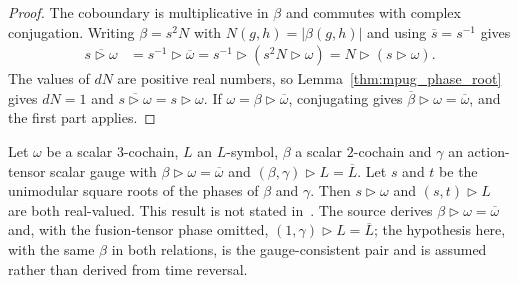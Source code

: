 \begin{proof}\leanok
    The coboundary is multiplicative in $\beta$ and commutes with complex
    conjugation. Writing $\beta=s^2N$ with $N(g,h)=|\beta(g,h)|$ and using
    $\overline s=s^{-1}$ gives
    \begin{align}
        \overline{s\mathbin{\triangleright}\omega}
         & =s^{-1}\mathbin{\triangleright}\overline\omega
        =s^{-1}\mathbin{\triangleright}(s^2N\mathbin{\triangleright}\omega)
        =N\mathbin{\triangleright}(s\mathbin{\triangleright}\omega).
    \end{align}
    The values of $dN$ are positive real numbers, so
    Lemma~\ref{thm:mpug_phase_root} gives $dN=1$ and
    $\overline{s\mathbin{\triangleright}\omega}
        =s\mathbin{\triangleright}\omega$. If
    $\omega=\beta\mathbin{\triangleright}\overline\omega$, conjugating gives
    $\overline\beta\mathbin{\triangleright}\omega=\overline\omega$, and the
    first part applies.
\end{proof}

\begin{lemma}
    \label{thm:mpug_time_reversal_real_l_symbols}
    \leanok
    Let $\omega$ be a scalar $3$-cochain, $L$ an $L$-symbol, $\beta$ a
    scalar $2$-cochain and $\gamma$ an action-tensor scalar gauge with
    $\beta\mathbin{\triangleright}\omega=\overline\omega$ and
    $(\beta,\gamma)\mathbin{\triangleright}L=\overline L$. Let $s$ and $t$ be
    the unimodular square roots of the phases of $\beta$ and $\gamma$. Then
    $s\mathbin{\triangleright}\omega$ and
    $(s,t)\mathbin{\triangleright}L$ are both real-valued. This result is not stated
    in~\cite[Section~4.3]{GarreRubio2023MPOSym}.
    The source derives $\beta\mathbin{\triangleright}\omega=\overline\omega$
    and, with the fusion-tensor phase omitted,
    $(1,\gamma)\mathbin{\triangleright}L=\overline L$; the hypothesis here,
    with the same $\beta$ in both relations, is the gauge-consistent pair
    and is assumed rather than derived from time reversal.
\end{lemma}

